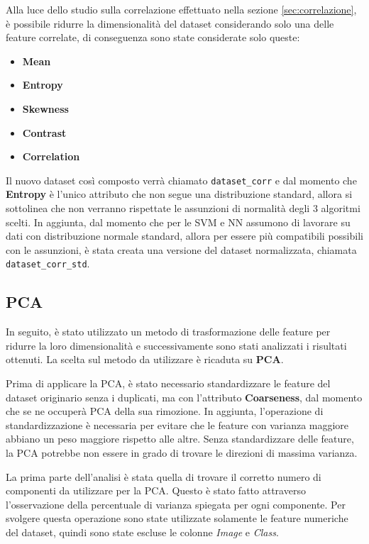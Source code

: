 Alla luce dello studio sulla correlazione effettuato nella sezione \ref{sec:correlazione},
è possibile ridurre la dimensionalità del dataset considerando solo una delle
feature correlate, di conseguenza sono state considerate solo queste:
\begin{itemize}
      \item \textbf{Mean}
      \item \textbf{Entropy}
      \item \textbf{Skewness}
      \item \textbf{Contrast}
      \item \textbf{Correlation}
\end{itemize}
Il nuovo dataset così composto verrà chiamato \texttt{dataset\_corr} e dal momento
che \textbf{Entropy} è l'unico attributo che non segue una distribuzione standard,
allora si sottolinea che non verranno rispettate le assunzioni di normalità degli
$3$ algoritmi scelti. In aggiunta, dal momento che per le SVM e NN assumono di
lavorare su dati con distribuzione normale standard, allora per essere più
compatibili possibili con le assunzioni, è stata creata una versione del dataset
normalizzata, chiamata \texttt{dataset\_corr\_std}.
\subsection{PCA} \label{sec:pca}
In seguito, è stato utilizzato un metodo di trasformazione delle feature per 
ridurre la loro dimensionalità e successivamente sono stati analizzati i
risultati ottenuti. La scelta sul metodo da utilizzare è ricaduta su \textbf{PCA}.

Prima di applicare la PCA, è stato necessario standardizzare le feature del dataset
originario senza i duplicati, ma con l'attributo \textbf{Coarseness}, dal momento
che se ne occuperà PCA della sua rimozione. In aggiunta, l'operazione di
standardizzazione è necessaria per evitare che le feature con varianza maggiore
abbiano un peso maggiore rispetto alle altre. Senza standardizzare delle feature,
la PCA potrebbe non essere in grado di trovare le direzioni di massima varianza.

La prima parte dell'analisi è stata quella di trovare il corretto numero di
componenti da utilizzare per la PCA. Questo è stato fatto attraverso
l'osservazione della percentuale di varianza spiegata per ogni componente. Per
svolgere questa operazione sono state utilizzate solamente le feature numeriche
del dataset, quindi sono state escluse le colonne \textit{Image} e \textit{Class}.

